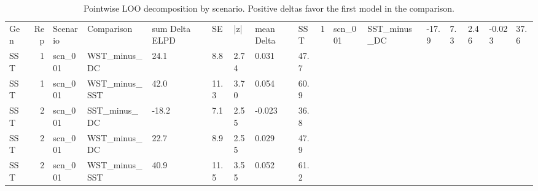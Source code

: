 \begin{table}[!h]
\centering
\caption{Pointwise LOO decomposition by scenario. Positive deltas favor the first model in the comparison.}
\centering
\begin{tabular}[t]{lrlllllll}
\toprule
Gen & Rep & Scenario & Comparison & sum Delta ELPD & SE & |z| & mean Delta & %
\midrule
SST & 1 & scn_001 & SST_minus_DC & -17.9 & 7.3 & 2.46 & -0.023 & 37.6\\
SST & 1 & scn_001 & WST_minus_DC & 24.1 & 8.8 & 2.74 & 0.031 & 47.7\\
SST & 1 & scn_001 & WST_minus_SST & 42.0 & 11.3 & 3.70 & 0.054 & 60.9\\
SST & 2 & scn_001 & SST_minus_DC & -18.2 & 7.1 & 2.55 & -0.023 & 36.8\\
SST & 2 & scn_001 & WST_minus_DC & 22.7 & 8.9 & 2.55 & 0.029 & 47.9\\
\addlinespace
SST & 2 & scn_001 & WST_minus_SST & 40.9 & 11.5 & 3.55 & 0.052 & 61.2\\
\bottomrule
\end{tabular}
\end{table}
